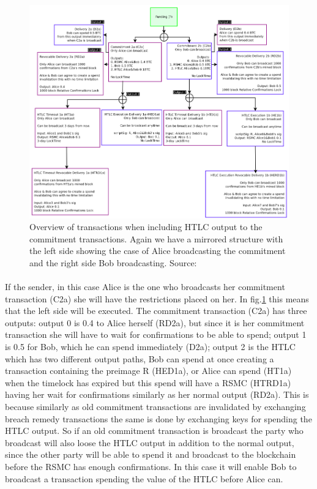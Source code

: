 \documentclass[informationsecurity]{gucmasterproject}
\begin{document}
\begin{figure}[h]
    \centering
    \includegraphics[width=14cm]{figs/ln_htlc.png}
    \caption{ Overview of transactions when including HTLC output to the commitment transactions. Again we have a mirrored structure with the left side showing the case of Alice broadcasting the commitment and the right side Bob broadcasting.  Source: \cite{poon2015bitcoin}}
    \label{fig:htlc_commit}
\end{figure}


\paragraph{}
If the sender, in this case Alice is the one who broadcasts her commitment transaction (C2a) she will have the restrictions placed on her.
In fig.\ref{fig:htlc_commit} this means that the left side will be executed. The commitment transaction (C2a) has three outputs: output 0 is 0.4 to Alice herself (RD2a), but since it is her commitment transaction she will have to wait for confirmations to be able to spend; output 1 is 0.5 for Bob, which he can spend immediately (D2a); output 2 is the HTLC which has two different output paths, Bob can spend at once creating a transaction containing the preimage R (HED1a), or Alice can spend (HT1a) when the timelock has expired but this spend will have a RSMC (HTRD1a) having her wait for confirmations similarly as her normal output (RD2a). This is because similarly as old commitment transactions are invalidated by exchanging breach remedy transactions the same is done by exchanging keys for spending the HTLC output. So if an old commitment transaction is broadcast the party who broadcast will also loose the HTLC output in addition to the normal output, since the other party will be able to spend it and broadcast to the blockchain before the RSMC has enough confirmations. In this case it will enable Bob to broadcast a transaction spending the value of the HTLC before Alice can.
\end{document}
